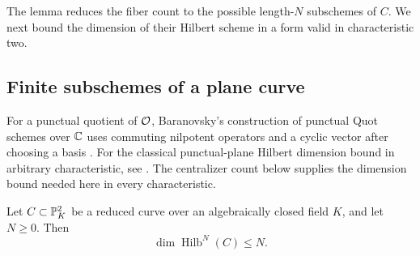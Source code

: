 The lemma reduces the fiber count to the possible length-$N$ subschemes
of $C$.  We next bound the dimension of their Hilbert scheme in a form
valid in characteristic two.

\subsection{Finite subschemes of a plane curve}

For a punctual quotient of $\mathcal O$, Baranovsky's construction of punctual
Quot schemes over $\mathbb C$ uses commuting nilpotent operators and a cyclic
vector after choosing a basis \cite[Section~2, Lemma~2.2]{Baranovsky1998}.
For the classical punctual-plane Hilbert dimension bound in arbitrary
characteristic, see \cite[Corollary~4.1]{Premet2003}.
The centralizer count below supplies the dimension bound needed here in
every characteristic.

\begin{lemma}\label{lem:hilbert-curve-dimension}
Let $C\subset\mathbb P^2_K$ be a reduced curve over an algebraically closed
field $K$, and let $N\geq0$.  Then
\[
 \dim\operatorname{Hilb}^N(C)\leq N.
\]
\end{lemma}


